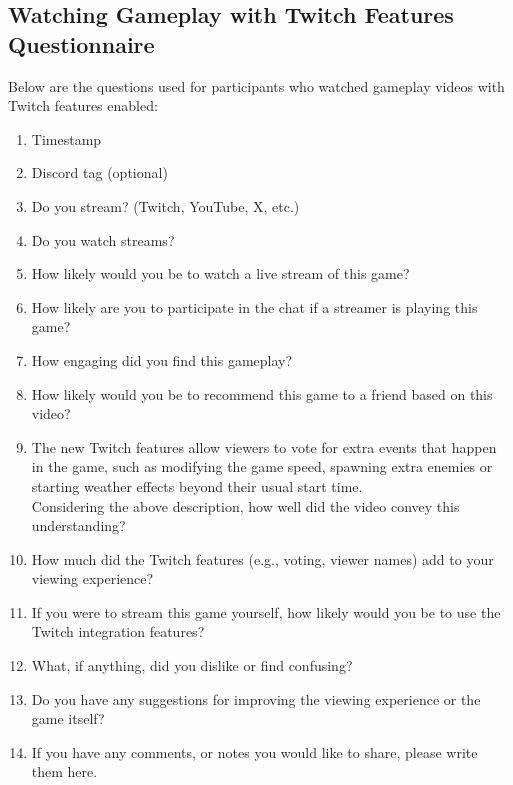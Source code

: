 \documentclass[conference]{IEEEtran}
\begin{document}
\subsection{Watching Gameplay with Twitch Features Questionnaire}
Below are the questions used for participants who watched gameplay videos with Twitch features enabled:
\begin{enumerate}
    \item Timestamp
    \item Discord tag (optional)
    \item Do you stream? (Twitch, YouTube, X, etc.)
    \item Do you watch streams?
    \item How likely would you be to watch a live stream of this game?
    \item How likely are you to participate in the chat if a streamer is playing this game?
    \item How engaging did you find this gameplay?
    \item How likely would you be to recommend this game to a friend based on this video?
    \item The new Twitch features allow viewers to vote for extra events that happen in the game, such as modifying the game speed, spawning extra enemies or starting weather effects beyond their usual start time.\\
    Considering the above description, how well did the video convey this understanding?
    \item How much did the Twitch features (e.g., voting, viewer names) add to your viewing experience?
    \item If you were to stream this game yourself, how likely would you be to use the Twitch integration features?
    \item What, if anything, did you dislike or find confusing?
    \item Do you have any suggestions for improving the viewing experience or the game itself?
    \item If you have any comments, or notes you would like to share, please write them here.
\end{enumerate}
\end{document}
